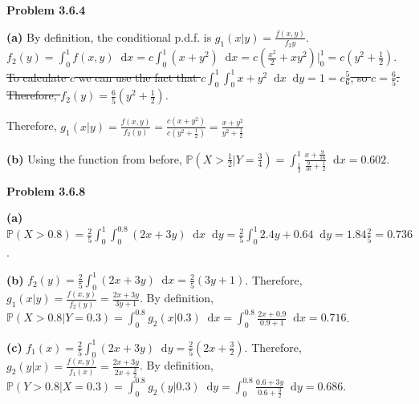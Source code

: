 \documentclass[11pt]{amsart}
\newcommand*\diff{\mathop{}\!\mathrm{d}}
\newcommand{\problem}[1]{\bigskip\noindent\textbf{Problem #1}}
\newcommand{\ppart}[1]{\bigskip\textbf{(#1)}}
\begin{document}
\problem{3.6.4}

\ppart{a}
By definition, the conditional p.d.f. is $g_1(x|y) = \frac{f(x, y)}{f_2{y}}$. $f_2(y) = \int_0^1 f(x, y) \diff x = c\int_0^1 (x + y^2) \diff x = c\left( \frac{x^2}{2} + xy^2 \right) \Big|_0^1 = c\left(y^2 + \frac{1}{2}\right)$. \sout{To calculate $c$ we can use the fact that $c\int_0^1 \int_0^1 x + y^2 \diff x \diff y = 1 = c\frac{5}{6}$, so $c = \frac{6}{5}$. Therefore, $f_2(y) = \frac{6}{5}\left(y^2 + \frac{1}{2}\right)$}.

Therefore, $g_1(x|y) = \frac{f(x, y)}{f_2(y)} = \frac{c(x + y^2)}{c\left(y^2 + \frac{1}{2}\right)} = \frac{x + y^2}{y^2 + \frac{1}{2}}$

\ppart{b}
Using the function from before, $\mathbb{P}\left(X > \frac{1}{2} | Y = \frac{3}{4}\right) = \int_{\frac{1}{2}}^1 \frac{x + \frac{9}{16}}{\frac{9}{16} + \frac{1}{2}} \diff x = 0.602$.

\problem{3.6.8}

\ppart{a}
$\mathbb{P}(X > 0.8) = \frac{2}{5}\int_0^1 \int_0^{0.8} (2x + 3y) \diff x \diff y = \frac{2}{5}\int_0^1 2.4y + 0.64 \diff y = 1.84\frac{2}{5} = 0.736$.

\ppart{b}
$f_2(y) = \frac{2}{5}\int_0^1 (2x + 3y) \diff x = \frac{2}{5}(3y + 1)$. Therefore, $g_1(x | y) = \frac{f(x, y)}{f_2(y)} = \frac{2x + 3y}{3y + 1}$. By definition, $\mathbb{P}(X > 0.8 | Y = 0.3) = \int_0^{0.8} g_2(x | 0.3) \diff x = \int_0^{0.8} \frac{2x + 0.9}{0.9 + 1} \diff x = 0.716$.

\ppart{c}
$f_1(x) = \frac{2}{5}\int_0^1 (2x + 3y) \diff y = \frac{2}{5}\left(2x + \frac{3}{2}\right)$. Therefore, $g_2(y | x) = \frac{f(x, y)}{f_1(x)} = \frac{2x + 3y}{2x + \frac{3}{2}}$. By definition, $\mathbb{P}(Y > 0.8 | X = 0.3) = \int_0^{0.8} g_2(y | 0.3) \diff y = \int_0^{0.8} \frac{0.6 + 3y}{0.6 + \frac{3}{2}} \diff y = 0.686$.
\end{document}
